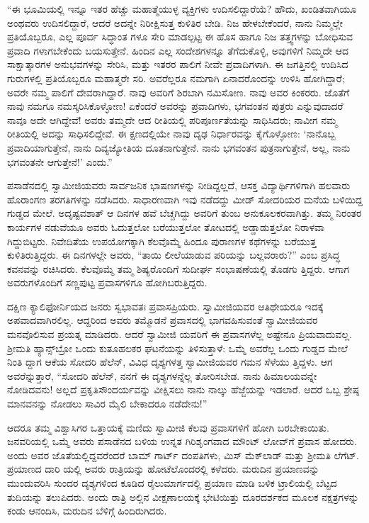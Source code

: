“ಈ ಭೂಮಿಯಲ್ಲಿ ಇನ್ನೂ ಇತರ ಹೆಚ್ಚು ಮಹಾತ್ಮೆಯುಳ್ಳ ವ್ಯಕ್ತಿಗಳು ಉದಿಸಲಿದ್ದಾರೆಯೆ? ಹೌದು, ಖಂಡಿತವಾಗಿಯೂ ಅಂಥವರು ಉದಿಸಲಿದ್ದಾರೆ, ಆದರೆ ಅದನ್ನೇ ನಿರೀಕ್ಷಿಸುತ್ತ ಕುಳಿತಿರ ಬೇಡಿ. ನಿಜ ಹೇಳಬೇಕೆಂದರೆ, ನಾನು ನಿಮ್ಮಲ್ಲೇ ಪ್ರತಿಯೊಬ್ಬರೂ, ಎಲ್ಲ ಪೂರ್ವ ಸಿದ್ಧಾಂತ ಗಳೂ ಸೇರಿ ಮಾಡಲ್ಪಟ್ಟ ಈ ಹೊಸ ಹಾಗೂ ನಿಜ ತತ್ತ್ವಗಳನ್ನು ಬೋಧಿಸುವ ಪ್ರವಾದಿ ಗಳಾಗಬೇಕೆಂದು ಬಯಸುತ್ತೇನೆ. ಹಿಂದಿನ ಎಲ್ಲ ಸಂದೇಶಗಳನ್ನೂ ತೆಗೆದುಕೊಳ್ಳಿ, ಅವುಗಳಿಗೆ ನಿಮ್ಮದೇ ಆದ ಸಾಕ್ಷಾತ್ಕಾರಗಳ ಅನುಭವಗಳನ್ನು ಸೇರಿಸಿ, ಮತ್ತು ಇತರರ ಪಾಲಿಗೆ ನೀವೇ ಪ್ರವಾದಿಗಳಾಗಿ. ಈ ಜಗತ್ತಿನಲ್ಲಿ ಉದಿಸಿದ ಗುರುಗಳಲ್ಲಿ ಪ್ರತಿಯೊಬ್ಬರೂ ಮಹಾತ್ಮರೇ ಸರಿ. ಅವರೆಲ್ಲರೂ ನಮಗಾಗಿ ಏನಾದರೊಂದನ್ನು ಉಳಿಸಿ ಹೋಗಿದ್ದಾರೆ; ಅವರೇ ನಮ್ಮ ಪಾಲಿಗೆ ದೇವರಾಗಿದ್ದಾರೆ. ನಾವು ಅವರಿಗೆ ಶಿರಬಾಗಿ ನಮಿಸೋಣ. ನಾವು ಅವರ ಕಿಂಕರರು. ಜೊತೆಗೆ ನಾವು ನಮಗೂ ನಮಸ್ಕರಿಸಿಕೊಳ್ಳೋಣ! ಏಕೆಂದರೆ ಅವರನ್ನು ಪ್ರವಾದಿಗಳು, ಭಗವಂತನ ಪುತ್ರರು ಎನ್ನುವುದಾದರೆ ನಾವೂ ಅದೇ ಆಗಿದ್ದೇವೆ! ಅವರು ತಮ್ಮದೇ ಆದ ರೀತಿಯಲ್ಲಿ ಪರಿಪೂರ್ಣತೆಯನ್ನು ಸಾಧಿಸಿದರು; ನಾವೀಗ ನಮ್ಮ ರೀತಿಯಲ್ಲಿ ಅದನ್ನು ಸಾಧಿಸಲಿದ್ದೇವೆ. ಈ ಕ್ಷಣದಲ್ಲಿಯೇ ನಾವು ದೃಢ ನಿರ್ಧಾರವನ್ನು ಕೈಗೊಳ್ಳೋಣ: ‘ನಾನೊಬ್ಬ ಪ್ರವಾದಿಯಾಗುತ್ತೇನೆ, ನಾನು ದಿವ್ಯಜ್ಯೋತಿಯ ದೂತನಾಗುತ್ತೇನೆ. ನಾನು ಭಗವಂತನ ಪುತ್ರನಾಗುತ್ತೇನೆ, ಅಲ್ಲ, ನಾನು ಭಗವಂತನೇ ಆಗುತ್ತೇನೆ!’ ಎಂದು.”

ಪಸಾಡೆನದಲ್ಲಿ ಸ್ವಾಮೀಜಿಯವರು ಸಾರ್ವಜನಿಕ ಭಾಷಣಗಳನ್ನು ನೀಡಿದ್ದಲ್ಲದೆ, ಆಸಕ್ತ ವಿದ್ಯಾರ್ಥಿಗಳಿಗಾಗಿ ಹಲವಾರು ಹೊರಾಂಗಣ ತರಗತಿಗಳನ್ನು ನಡೆಸಿದರು. ಸಾಧಾರಣವಾಗಿ ಇವು ನಡೆದದ್ದು ಮೀಡ್ ಸೋದರಿಯರ ಮನೆಯ ಬಳಿಯಿದ್ದ ಗುಡ್ಡದ ಮೇಲೆ. ಅದೃಷ್ಟವಶಾತ್ ಆ ದಿನಗಳ ಹವೆ ಬೆಚ್ಚಗಿದ್ದು ಅವರಿಗೆ ತುಂಬ ಅನುಕೂಲಕರವಾಗಿತ್ತು. ತಮ್ಮ ನಿರಂತರ ಕಾರ್ಯಗಳ ನಡುವೆಯೂ ಅವರು ಓದುತ್ತಲೋ ಬರೆಯುತ್ತಲೋ ತೋಟದಲ್ಲಿ ಅಡ್ಡಾಡುತ್ತಲೋ ನಿರಾಳವಾ ಗಿದ್ದುಬಿಟ್ಟರು. ನಿವೇದಿತೆಯ ಉಪಯೋಗಕ್ಕಾಗಿ ಕೆಲವೊಮ್ಮೆ ಹಿಂದೂ ಪುರಾಣಗಳ ಕಥೆಗಳನ್ನು ಬರೆಯುತ್ತ ಕುಳಿತಿರುತ್ತಿದ್ದರು. ಈ ದಿನಗಳಲ್ಲೇ ಅವರು,  “ತಾಯಿ ಲೀಲೆಯಾಡುವ ಪರಿಯನ್ನು ಬಲ್ಲವರಾರು?” ಎಂಬ ಪ್ರಸಿದ್ಧ ಕವನವನ್ನು ರಚಿಸಿದರು. ಕೆಲವೊಮ್ಮೆ ತಮ್ಮ ಶಿಷ್ಯರೊಂದಿಗೆ ಸುದೀರ್ಘ ಸಂಭಾಷಣೆಯಲ್ಲಿ ತೊಡಗು ತ್ತಿದ್ದರು. ಆಗಾಗ ಅವರುಗಳೊಂದಿಗೆ ಸಣ್ಣಪುಟ್ಟ ಪ್ರವಾಸಗಳಿಗೂ ಹೋಗಿಬರುತ್ತಿದ್ದರು.

ದಕ್ಷಿಣ ಕ್ಯಾಲಿಫೋರ್ನಿಯದ ಜನರು ಸ್ವಭಾವತಃ ಪ್ರವಾಸಪ್ರಿಯರು. ಸ್ವಾಮೀಜಿಯವರ ಆತಿಥೇಯರೂ ಇದಕ್ಕೆ ಅಪವಾದವಾಗಿರಲಿಲ್ಲ. ಆದ್ದರಿಂದ ಅವರು ತಮ್ಮೊಡನೆ ಪ್ರವಾಸದಲ್ಲಿ ಭಾಗವಹಿಸುವಂತೆ ಸ್ವಾಮೀಜಿಯವರ ಮನವೊಲಿಸುವ ಪ್ರಯತ್ನ ಮಾಡಿದರು. ಆದರೆ ಸ್ವಾಮೀಜಿ ಯವರಿಗೆ ಈ ಪ್ರವಾಸಗಳೆಲ್ಲ ಅಷ್ಟೇನೂ ಪ್ರಿಯವಾದುವಲ್ಲ. ಶ್ರೀಮತಿ ಹ್ಯಾನ್ಸ್​ಬ್ರೋ ಒಂದು ಕುತೂಹಲಕರ ಘಟನೆಯನ್ನು ತಿಳಿಸುತ್ತಾಳೆ: ಒಮ್ಮೆ ಅವರೆಲ್ಲ ಒಂದು ಗುಡ್ಡದ ಮೇಲೆ ನಿಂತಿ ದ್ದಾಗ ಆಕೆಯ ಸೋದರಿ ಹೆಲೆನ್, ವಿವಿಧ ದೃಶ್ಯಗಳತ್ತ ಸ್ವಾಮೀಜಿಯವರ ಗಮನ ಸೆಳೆಯು ತ್ತಿದ್ದಳು. ಆಗ ಅವರೆನ್ನುತ್ತಾರೆ, “ಸೋದರಿ ಹೆಲೆನ್, ನನಗೆ ಈ ದೃಶ್ಯಗಳನ್ನೆಲ್ಲ ತೋರಿಸಬೇಡ. ನಾನು ಹಿಮಾಲಯವನ್ನೇ ನೋಡಿದವನು! ಅಲ್ಲದೆ ಪ್ರಕೃತಿಸೌಂದರ್ಯವನ್ನು ವೀಕ್ಷಿಸಲು ನಾನು ನಾಲ್ಕು ಹೆಜ್ಜೆಯನ್ನು ಇಡಲಾರೆ. ಆದರೆ ಒಬ್ಬ ಶ್ರೇಷ್ಠ ಮಾನವನನ್ನು ನೋಡಲು ಸಾವಿರ ಮೈಲಿ ಬೇಕಾದರೂ ನಡೆದೇನು!”

ಆದರೂ ತಮ್ಮ ವಿಶ್ವಾಸಿಗರ ಒತ್ತಾಯಕ್ಕೆ ಮಣಿದು ಸ್ವಾಮೀಜಿ ಕೆಲವು ಪ್ರವಾಸಗಳಿಗೆ ಹೋಗಿ ಬರಬೇಕಾಯಿತು. ಜನವರಿಯಲ್ಲಿ ಒಮ್ಮೆ ಅವರು ಪಸಾಡೆನದ ಬಳಿಯ ಉನ್ನತ ಗಿರಿಶೃಂಗವಾದ ಮೌಂಟ್ ಲೋವ್​ಗೆ ಪ್ರವಾಸ ಹೋದರು. ಅಂದು ಅವರ ಜೊತೆಯಲ್ಲಿದ್ದವರೆಂದರೆ ಬಾಮ್ ಗಾರ್ಟ್ ದಂಪತಿಗಳು, ಮಿಸ್ ಮೆಕ್​ಲಾಡ್ ಮತ್ತು ಶ್ರೀಮತಿ ಲೆಗೆಟ್. ಪ್ರಯಾಣದ ದಾರಿ ಯಲ್ಲಿ ಅವರು ರಾತ್ರಿಯನ್ನು ಹೋಟೆಲೊಂದರಲ್ಲಿ ಕಳೆದರು. ಮರುದಿನ ಪ್ರಯಾಣವನ್ನು ಮುಂದುವರಿಸಿ ಸುಂದರ ದೃಶ್ಯಗಳಿಂದ ಕೂಡಿದ ರೈಲುಮಾರ್ಗದಲ್ಲಿ ಪ್ರಯಾಣ ಮಾಡಿ ಬಳಿಕ ಟ್ರಾಲಿಯಲ್ಲಿ ಬೆಟ್ಟದ ತುದಿಯನ್ನು ತಲುಪಿದರು. ಅಂದು ರಾತ್ರಿ ಅಲ್ಲಿನ ವೀಕ್ಷಣಾಲಯಕ್ಕೆ ಭೇಟಿಯಿತ್ತು ದೂರದರ್ಶಕದ ಮೂಲಕ ನಕ್ಷತ್ರಗಳನ್ನು ಕಂಡು ಆನಂದಿಸಿ, ಮರುದಿನ ಬೆಳಿಗ್ಗೆ ಹಿಂದಿರುಗಿದರು.

